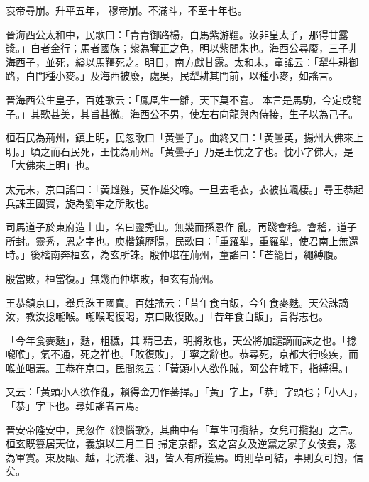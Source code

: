 \begin{pinyinscope}
 哀帝尋崩。升平五年，
 穆帝崩。不滿斗，不至十年也。



 晉海西公太和中，民歌曰：「青青御路楊，白馬紫游韁。汝非皇太子，那得甘露漿。」白者金行；馬者國族；紫為奪正之色，明以紫間朱也。海西公尋廢，三子非海西子，並死，縊以馬韁死之。明日，南方獻甘露。太和末，童謠云：「犁牛耕御路，白門種小麥。」及海西被廢，處吳，民犁耕其門前，以種小麥，如謠言。



 晉海西公生皇子，百姓歌云：「鳳凰生一雛，天下莫不喜。
 本言是馬駒，今定成龍子。」其歌甚美，其旨甚微。海西公不男，使左右向龍與內侍接，生子以為己子。



 桓石民為荊州，鎮上明，民忽歌曰「黃曇子」。曲終又曰：「黃曇英，揚州大佛來上明。」頃之而石民死，王忱為荊州。「黃曇子」乃是王忱之字也。忱小字佛大，是「大佛來上明」也。



 太元末，京口謠曰：「黃雌雞，莫作雄父啼。一旦去毛衣，衣被拉颯棲。」尋王恭起兵誅王國寶，旋為劉牢之所敗也。



 司馬道子於東府造土山，名曰靈秀山。無幾而孫恩作
 亂，再踐會稽。會稽，道子所封。靈秀，恩之字也。庾楷鎮歷陽，民歌曰：「重羅犁，重羅犁，使君南上無還時。」後楷南奔桓玄，為玄所誅。殷仲堪在荊州，童謠曰：「芒籠目，繩縛腹。



 殷當敗，桓當復。」無幾而仲堪敗，桓玄有荊州。



 王恭鎮京口，舉兵誅王國寶。百姓謠云：「昔年食白飯，今年食麥麩。天公誅謫汝，教汝捻嚨喉。嚨喉喝復喝，京口敗復敗。」「昔年食白飯」，言得志也。



 「今年食麥麩」，麩，粗穢，其
 精已去，明將敗也，天公將加譴謫而誅之也。「捻嚨喉」，氣不通，死之祥也。「敗復敗」，丁寧之辭也。恭尋死，京都大行咳疾，而喉並喝焉。王恭在京口，民間忽云：「黃頭小人欲作賊，阿公在城下，指縛得。」



 又云：「黃頭小人欲作亂，賴得金刀作蕃捍。」「黃」字上，「恭」字頭也；「小人」，「恭」字下也。尋如謠者言焉。



 晉安帝隆安中，民忽作《懊惱歌》，其曲中有「草生可攬結，女兒可攬抱」之言。桓玄既篡居天位，義旗以三月二日
 掃定京都，玄之宮女及逆黨之家子女伎妾，悉為軍賞。東及甌、越，北流淮、泗，皆人有所獲焉。時則草可結，事則女可抱，信矣。




\end{pinyinscope}
